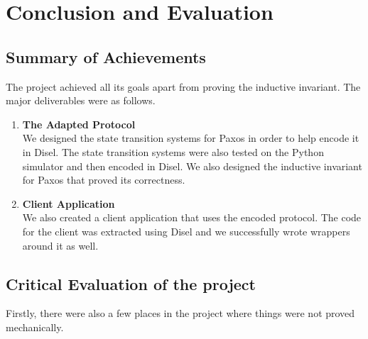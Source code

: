 \chapter{Conclusion and Evaluation}

\section{Summary of Achievements}
The project achieved all its goals apart from proving the inductive invariant.
The major deliverables were as follows.
\begin{enumerate}
  \item \textbf{The Adapted Protocol} \\
    We designed the state transition systems for Paxos in order to help encode it in
    Disel. The state transition systems were also tested on the Python simulator
    and then encoded in Disel. We also designed the inductive invariant for Paxos
    that proved its correctness.
  \item \textbf{Client Application} \\
    We also created a client application that uses the encoded protocol. The
    code for the client was extracted using Disel and we successfully wrote
    wrappers around it as well.
\end{enumerate}

\vspace{-5mm}
\section{Critical Evaluation of the project}
Firstly, there were also a few places in the project where things
were not proved mechanically.

